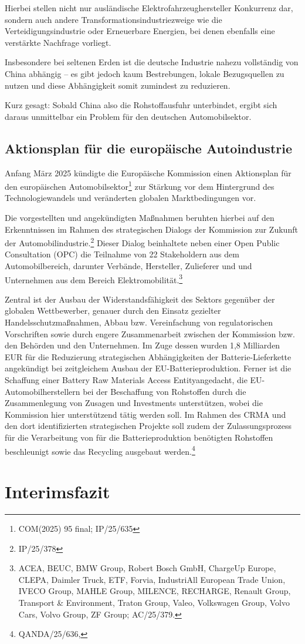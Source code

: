 \documentclass[12pt,a4paper,oneside]{book} %
\begin{document}
	
	Hierbei stellen nicht nur ausländische Elektrofahrzeughersteller Konkurrenz dar, sondern auch andere Transformationsindustriezweige wie die Verteidigungsindustrie oder Erneuerbare Energien, bei denen ebenfalls eine verstärkte Nachfrage vorliegt.\autocite{Expertenkreis Automobilwirtschaft}
	
	Insbesondere bei seltenen Erden ist die deutsche Industrie nahezu vollständig von China abhängig -- es gibt jedoch kaum Bestrebungen, lokale Bezugsquellen zu nutzen und diese Abhängigkeit somit zumindest zu reduzieren.
	
	Kurz gesagt: Sobald China also die Rohstoffausfuhr unterbindet, ergibt sich daraus unmittelbar ein Problem für den deutschen Automobilsektor.
	
	
	
	
	\subsection{Aktionsplan für die europäische Autoindustrie}
	Anfang März 2025 kündigte die Europäische Kommission einen Aktionsplan für den europäischen Automobilsektor\footnote{COM(2025) 95 final; IP/25/635} zur Stärkung vor dem Hintergrund des Technologiewandels und veränderten globalen Marktbedingungen vor.
	
	Die vorgestellten und angekündigten Maßnahmen beruhten hierbei auf den Erkenntnissen im Rahmen des strategischen Dialogs der Kommission zur Zukunft der Automobilindustrie.\footnote{IP/25/378} Dieser Dialog beinhaltete neben einer Open Public Consultation (OPC) die Teilnahme von 22 Stakeholdern aus dem Automobilbereich, darunter Verbände, Hersteller, Zulieferer und und Unternehmen aus dem Bereich Elektromobilität.\footnote{ACEA, BEUC, BMW Group, Robert Bosch GmbH, ChargeUp Europe, CLEPA, Daimler Truck, ETF, Forvia, IndustriAll European Trade Union, IVECO Group, MAHLE Group, MILENCE, RECHARGE, Renault Group, Transport \& Environment, Traton Group, Valeo, Volkswagen Group, Volvo Cars, Volvo Group, ZF Group; AC/25/379.}
	
	
	Zentral ist der Ausbau der Widerstandsfähigkeit des Sektors gegenüber der globalen Wettbewerber, genauer durch den Einsatz gezielter Handelsschutzmaßnahmen, Abbau bzw. Vereinfachung von regulatorischen Vorschriften sowie durch engere Zusammenarbeit zwischen der Kommission bzw. den Behörden und den Unternehmen. Im Zuge dessen wurden 1,8 Milliarden EUR für die Reduzierung strategischen Abhängigkeiten der Batterie-Lieferkette angekündigt bei zeitgleichem Ausbau der EU-Batterieproduktion. Ferner ist die Schaffung einer \glqq Battery Raw Materials Access Entity\grqq angedacht, die EU-Automobilherstellern bei der Beschaffung von Rohstoffen durch die Zusammenlegung von Zusagen und Investments unterstützen, wobei die Kommission hier unterstützend tätig werden soll. Im Rahmen des CRMA und den dort identifizierten strategischen Projekte soll zudem der Zulassungsprozess für die Verarbeitung von für die Batterieproduktion benötigten Rohstoffen beschleunigt sowie das Recycling ausgebaut werden.\footnote{QANDA/25/636, }
	
	
	
	\section{Interimsfazit}
\end{document}
